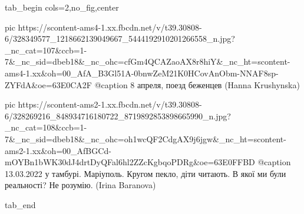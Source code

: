  
 
 
 
 

\begin{center}
\begin{minipage}{\textwidth}

\ifcmt
  tab_begin cols=2,no_fig,center

     pic https://scontent-ams4-1.xx.fbcdn.net/v/t39.30808-6/328349577_1218662139049667_5444192910201266558_n.jpg?_nc_cat=107&ccb=1-7&_nc_sid=dbeb18&_nc_ohc=cfGm4QCAZaoAX8r8hiY&_nc_ht=scontent-ams4-1.xx&oh=00_AfA_B3Gl51A-0bnwZeM21K0HCovAnObm-NNAF8sp-ZYFdA&oe=63E0CA2F
     @caption 8 апреля, поезд беженцев (Hanna Krushynska)

     pic https://scontent-ams2-1.xx.fbcdn.net/v/t39.30808-6/328269216_848934716180722_8719892853898665990_n.jpg?_nc_cat=108&ccb=1-7&_nc_sid=dbeb18&_nc_ohc=oh1wcQF2CdgAX9j6jgw&_nc_ht=scontent-ams2-1.xx&oh=00_AfBGCd-mOYBn1bWK30dJ4drtDyQFal6hl2ZZcKgbqoPDRg&oe=63E0FFBD
     @caption 13.03.2022 у тамбурі. Маріуполь. Кругом пекло, діти читають. В якої ми були реальності? Не розумію. (Irina Baranova)

  tab_end
\fi
\end{minipage}
\end{center}

